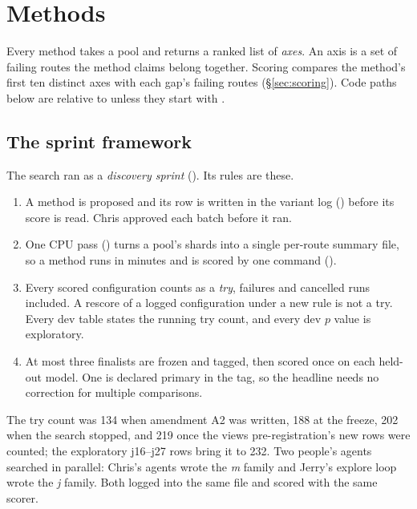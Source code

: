 \section{Methods}
\label{sec:methods}

Every method takes a pool and returns a ranked list of \emph{axes}. An axis is a
set of failing routes the method claims belong together. Scoring compares the
method's first ten distinct axes with each gap's failing routes
(\S\ref{sec:scoring}). Code paths below are relative to
 unless they start with
.

\subsection{The sprint framework}
\label{sec:sprint}

The search ran as a \emph{discovery sprint} ().
Its rules are these.
\begin{enumerate}
  \item A method is proposed and its row is written in the variant log
        () before its score is read. Chris approved each batch
        before it ran.
  \item One CPU pass () turns a pool's shards into a single
        per-route summary file, so a method runs in minutes and is scored by one
        command ().
  \item Every scored configuration counts as a \emph{try}, failures and
        cancelled runs included. A rescore of a logged configuration under a new
        rule is not a try. Every dev table states the running try count, and
        every dev $p$ value is exploratory.
  \item At most three finalists are frozen and tagged, then scored once on each
        held-out model. One is declared primary in the tag, so the headline
        needs no correction for multiple comparisons.
\end{enumerate}
The try count was 134 when amendment A2 was written, 188 at the freeze, 202 when
the search stopped, and 219 once the views pre-registration's new rows were
counted; the exploratory j16--j27 rows bring it to 232.
Two people's agents searched in parallel: Chris's agents wrote the
\emph{m} family and Jerry's explore loop wrote the \emph{j} family. Both logged
into the same file and scored with the same scorer.

